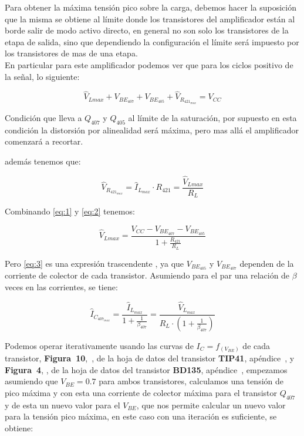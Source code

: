 \vspace{1.5cm}

\label{punto8}

Para obtener la máxima tensión pico sobre la carga, debemos hacer la suposición que la misma se obtiene al límite donde los transistores del amplificador están al borde salir de modo activo directo, en general no son solo los transistores de la etapa de salida, sino que dependiendo la configuración el límite será impuesto por los transistores de mas de una etapa.\\

En particular para este amplificador podemos ver que para los ciclos positivo de la señal, lo siguiente:

\begin{equation} \label{eq:1}
\hat{V}_{L{max}} + V_{BE_{407}} + V_{BE_{405}} + \hat{V}_{R_{421_{max}}} = V_{CC}
\end{equation}

Condición que lleva a $Q_{407}$ y $Q_{405}$ al límite de la saturación, por supuesto en esta condición la distorsión por alinealidad será  máxima, pero mas allá el amplificador comenzará a recortar.

además tenemos que:

\begin{equation} \label{eq:2}
\hat{V}_{R_{421_{max}}} = \hat{I}_{L_{max}} \cdot R_{421} = \frac{\hat{V}_{L{max}}}{R_{L}}
\end{equation}

Combinando \ref{eq:1} y \ref{eq:2} tenemos:

\begin{equation} \label{eq:3}
\hat{V}_{L{max}} = \frac{V_{CC} - V_{BE_{407}} - V_{BE_{405}} }{1 + \frac{R_{421}}{R_{L}} }
\end{equation}


Pero \ref{eq:3} es una expresión trascendente , ya que $V_{BE_{405}}$ y $V_{BE_{407}}$ dependen de la corriente de colector de cada transistor. Asumiendo para el par una relación de $\beta$ veces en las corrientes, se tiene:


\begin{equation} \label{eq:3}
 \hat{I}_{C_{407_{max}}} = \frac{\hat{I}_{L_{max}}}{1 + \frac{1}{\beta_{407}} } = \frac{\hat{V}_{L_{max}}}{ R_{L} \cdot \left( 1 + \frac{1}{\beta_{407}} \right) }
\end{equation}

Podemos operar iterativamente usando las curvas de $I_{C} = f_{\left( V_{BE} \right)}$ de cada transistor, \textbf{Figura~10},\, , de la hoja de datos del transistor \textbf{TIP41}, apéndice~, y \textbf{Figura~4}, , de la hoja de datos del transistor \textbf{BD135}, apéndice~, empezamos asumiendo que $V_{BE} = 0.7$ para ambos transistores, calculamos una tensión de pico máxima y con esta una corriente de colector máxima para el transistor $Q_{407}$ y de esta un nuevo valor para el $V_{BE}$, que nos permite calcular un nuevo valor para la tensión pico máxima, en este caso con una iteración es suficiente, se obtiene:

